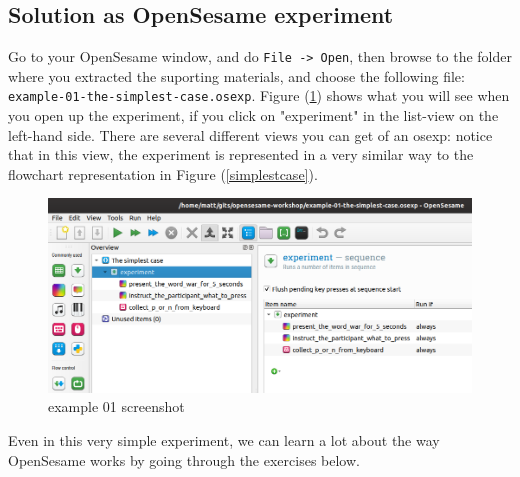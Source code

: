 \documentclass[a4paper]{tufte-handout}
\begin{document}
\subsection{Solution as OpenSesame experiment}
Go to your OpenSesame window, and do \texttt{File -> Open}, then browse to the folder where you extracted the suporting materials, and choose the following file: \texttt{example-01-the-simplest-case.osexp}. Figure (\ref{example-01-png}) shows what you will see when you open up the experiment, if you click on "experiment" in the list-view on the left-hand side. There are several different views you can get of an osexp: notice that in this view, the experiment is represented in a very similar way to the flowchart representation in Figure (\ref{simplestcase}).

\begin{figure}[hbtp]
\includegraphics[width=\textwidth]{screenshots/example-01.png}
\caption{example 01 screenshot}
\label{example-01-png}
\end{figure}

Even in this very simple experiment, we can learn a lot about the way OpenSesame works by going through the exercises below.
\end{document}

